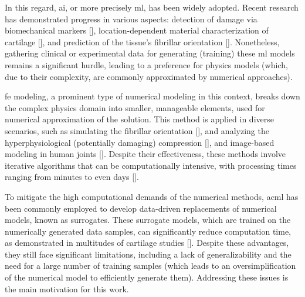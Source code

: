 \documentclass[12pt,a4paper]{report}
\begin{document}
In this regard, \ac{ai}, or more precisely \ac{ml}, has been widely adopted. Recent research has demonstrated progress in various aspects: detection of damage via biomechanical markers [\cite{alunnicardinali2023}], location-dependent material characterization of cartilage [\cite{niasar2023}], and prediction of the tissue's fibrillar orientation [\cite{mirmojarabian2023}]. Nonetheless, gathering clinical or experimental data for generating (training) these \ac{ml} models remains a significant hurdle, leading to a preference for physics models (which, due to their complexity, are commonly approximated by numerical approaches).

\ac{fe} modeling, a prominent type of numerical modeling in this context, breaks down the complex physics domain into smaller, manageable elements, used for numerical approximation of the solution. This method is applied in diverse scenarios, such as simulating the fibrillar orientation [\cite{sajjadinia2021b}], and analyzing the hyperphysiological (potentially damaging) compression [\cite{occhetta2019}], and image-based modeling in human joints [\cite{thienkarochanakul2020}]. Despite their effectiveness, these methods involve iterative algorithms that can be computationally intensive, with processing times ranging from minutes to even days [\cite{donahue2002,kazemi2011,naghibi2016,wang2018b,lorza2021}].

To mitigate the high computational demands of the numerical methods, ac{ml} has been commonly employed to develop data-driven replacements of numerical models, known as surrogates. These surrogate models, which are trained on the numerically generated data samples, can significantly reduce computation time, as demonstrated in multitudes of cartilage studies [\cite{paiva2012,arbabi2016a,arbabi2016b,egli2021}]. Despite these advantages, they still face significant limitations, including a lack of generalizability and the need for a large number of training samples (which leads to an oversimplification of the numerical model to efficiently generate them). Addressing these issues is the main motivation for this work.
\end{document}
